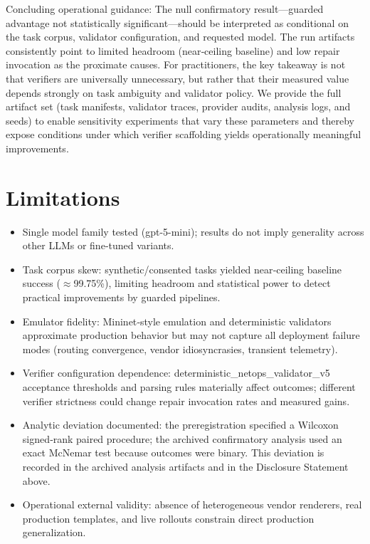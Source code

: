 \documentclass[conference]{IEEEtran}
\begin{document}
Concluding operational guidance: The null confirmatory result---guarded advantage not statistically significant---should be interpreted as conditional on the task corpus, validator configuration, and requested model. The run artifacts consistently point to limited headroom (near‑ceiling baseline) and low repair invocation as the proximate causes. For practitioners, the key takeaway is not that verifiers are universally unnecessary, but rather that their measured value depends strongly on task ambiguity and validator policy. We provide the full artifact set (task manifests, validator traces, provider audits, analysis logs, and seeds) to enable sensitivity experiments that vary these parameters and thereby expose conditions under which verifier scaffolding yields operationally meaningful improvements.

\section{Limitations}
\begin{itemize}
\item Single model family tested (gpt-5-mini); results do not imply generality across other LLMs or fine‑tuned variants.
\item Task corpus skew: synthetic/consented tasks yielded near‑ceiling baseline success (\ensuremath{\approx}99.75\%), limiting headroom and statistical power to detect practical improvements by guarded pipelines.
\item Emulator fidelity: Mininet‑style emulation and deterministic validators approximate production behavior but may not capture all deployment failure modes (routing convergence, vendor idiosyncrasies, transient telemetry).
\item Verifier configuration dependence: deterministic\_netops\_validator\_v5 acceptance thresholds and parsing rules materially affect outcomes; different verifier strictness could change repair invocation rates and measured gains.
\item Analytic deviation documented: the preregistration specified a Wilcoxon signed‑rank paired procedure; the archived confirmatory analysis used an exact McNemar test because outcomes were binary. This deviation is recorded in the archived analysis artifacts and in the Disclosure Statement above.
\item Operational external validity: absence of heterogeneous vendor renderers, real production templates, and live rollouts constrain direct production generalization.
\end{itemize}
\end{document}
